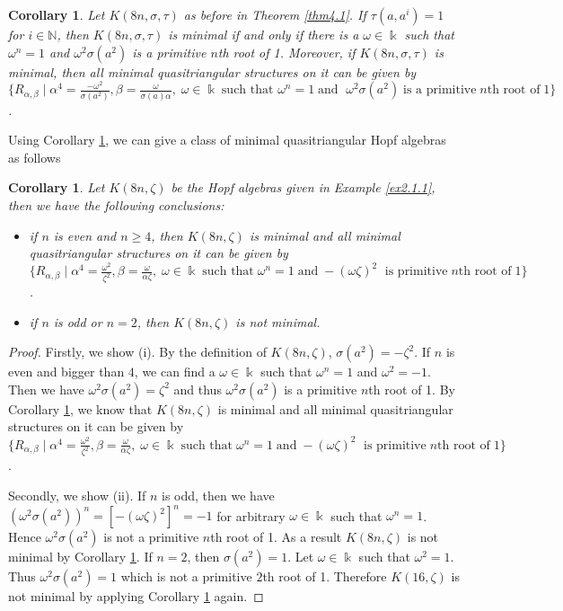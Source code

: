 \documentclass[a4paper,11pt]{amsart}
\numberwithin{equation}{section}
\newtheorem{corollary}[theorem]{Corollary}
\begin{document}
\begin{corollary} \label{coro4.2}
Let $K(8n,\sigma,\tau)$ as before in Theorem \ref{thm4.1}. If $\tau(a,a^i)=1$ for $i\in \mathbb{N}$, then $K(8n,\sigma,\tau)$ is minimal if and only if there is a $\omega \in \Bbbk$ such that $\omega^n=1$ and $\omega^2 \sigma(a^2)$ is a primitive $n$th root of 1. Moreover, if $K(8n,\sigma,\tau)$ is minimal, then all minimal quasitriangular structures on it can be given by
 $\{R_{\alpha,\beta}\;|\;\alpha^4=\frac{-\omega^2}{\sigma(a^2)}, \beta=\frac{\omega}{\sigma(a)\alpha} ,\; \omega \in \Bbbk \; \text{such that }\omega^n=1 \; \text{and } \; \omega^2 \sigma(a^2)\; \text{is a primitive} \;n\text{th root of}\;1\}$.
\end{corollary}

Using Corollary \ref{coro4.2}, we can give a class of minimal quasitriangular Hopf algebras as follows

\begin{corollary} \label{coro4.3}
Let $K(8n,\zeta)$ be the Hopf algebras given in Example \ref{ex2.1.1}, then we have the following conclusions:
\begin{itemize}
  \item[(i)] if $n$ is even and $n\geq 4$, then $K(8n,\zeta)$ is minimal and all minimal quasitriangular structures on it can be given by
 $\{R_{\alpha,\beta}\;|\;\alpha^4=\frac{\omega^2}{\zeta^2}, \beta=\frac{\omega}{\alpha \zeta} ,\; \omega \in \Bbbk \; \text{such that}\; \omega^n=1 \;\text{and} \; -(\omega \zeta)^2\; \text{ is primitive} \;n\text{th root of}\;1\}$.
 \item[(ii)] if $n$ is odd or $n=2$, then $K(8n,\zeta)$ is not minimal.
\end{itemize}
\end{corollary}

\begin{proof}
Firstly, we show (i). By the definition of $K(8n,\zeta)$,  $\sigma(a^2)=-\zeta^2$. If $n$ is even and bigger than $4$, we can find a $\omega\in \Bbbk$ such that $\omega^n=1$ and $\omega^2=-1$. Then we have $\omega^2\sigma(a^2)=\zeta^2$ and thus $\omega^2\sigma(a^2)$ is a primitive $n$th root of 1. By Corollary \ref{coro4.2}, we know that $K(8n,\zeta)$ is minimal and all minimal quasitriangular structures on it can be given by
 $\{R_{\alpha,\beta}\;|\;\alpha^4=\frac{\omega^2}{\zeta^2}, \beta=\frac{\omega}{\alpha \zeta}, \; \omega \in \Bbbk \; \text{such that}\; \omega^n=1 \;\text{and} \; -(\omega \zeta)^2\; \text{ is primitive} \;n\text{th root of}\;1\}$.

Secondly, we show (ii). If $n$ is odd, then we have $(\omega^2\sigma(a^2))^n=[-(\omega\zeta)^2]^n=-1$ for arbitrary $\omega\in \Bbbk$ such that $\omega^n=1$. Hence $\omega^2\sigma(a^2)$ is not a primitive $n$th root of 1. As a result $K(8n,\zeta)$ is not minimal by Corollary \ref{coro4.2}. If $n=2$, then $\sigma(a^2)=1$. Let $\omega\in \Bbbk$ such that $\omega^2=1$. Thus $\omega^2 \sigma(a^2)=1$ which is not a primitive $2$th root of 1. Therefore $K(16,\zeta)$ is not minimal by applying Corollary \ref{coro4.2} again.
\end{proof}
\end{document}
